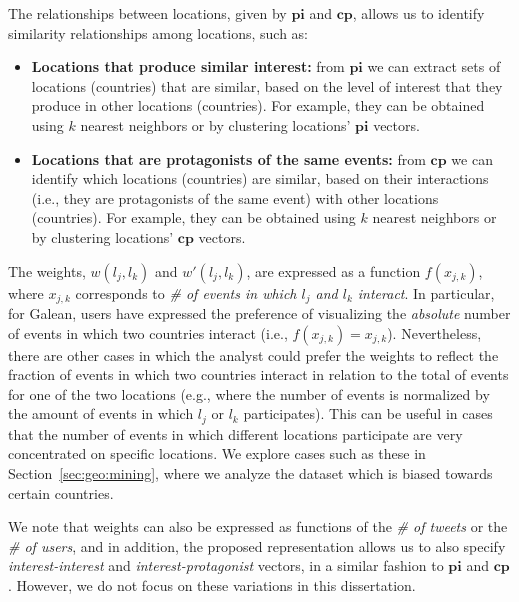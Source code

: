 The relationships between locations, given by $\mathbf{pi}$ and $\mathbf{cp}$,
allows us to identify similarity relationships among locations, such as:

\begin{itemize}
\item{\bf Locations that produce similar interest:} 
%
from $\mathbf{pi}$ we can extract sets of locations (countries) that are
similar, based on the level of interest that they produce in other locations
(countries). 
%
For example, they can be obtained using $k$ nearest neighbors or by clustering
locations' $\mathbf{pi}$ vectors.

\item{\bf Locations that are protagonists of the same events:} 
%
from $\mathbf{cp}$ we can identify which locations (countries) are similar,
based on their interactions (i.e., they are protagonists of the same event) with
other locations (countries). 
%
For example, they can be obtained using $k$ nearest neighbors or by clustering
locations' $\mathbf{cp}$ vectors.
\end{itemize}

The weights, $w(l_j,l_k)$ and $w'(l_j,l_k)$, are expressed as a function
$f(x_{j,k})$, where $x_{j,k}$ corresponds to {\em \# of events in which $l_j$
and $l_k$ interact}. 
%
In particular, for Galean, users have expressed the preference of visualizing
the {\em absolute} number of events in which two countries interact (i.e.,
$f(x_{j,k})=x_{j,k}$).  
%
Nevertheless, there are other cases in which the analyst could prefer the
weights to reflect the fraction of events in which two countries interact in
relation to the total of events for one of the two locations (e.g., where the
number of events is normalized by the amount of events in which $l_j$ or $l_k$
participates).
%
This can be useful in cases that the number of events in which different
locations participate are very concentrated on specific locations. 
%
We explore cases such as these in Section~\ref{sec:geo:mining}, where we analyze
the dataset which is biased towards certain countries.


We note that weights can also be expressed as functions of the {\em \# of
tweets} or the {\em \# of users}, and in addition, the proposed representation
allows us to also specify {\em interest-interest} and {\em interest-protagonist}
vectors, in a similar fashion to $\mathbf{pi}$ and $\mathbf{cp}$. 
%
However, we do not focus on these variations in this dissertation.

